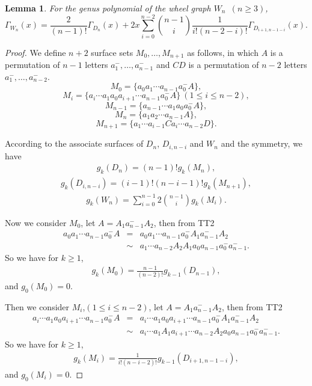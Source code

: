 \documentclass[12pt]{article}
\newtheorem{lemma}[theorem]{Lemma}
\theoremstyle{definition}
\begin{document}
\begin{lemma}\label{le2:1}
For the genus polynomial of the wheel graph $W_n$~$(n\geq 3)$, $$\Gamma_{W_n}(x)= \frac{2}{(n-1)!}\Gamma_{D_{n}}(x)+2x\sum\limits_{i=0}^{n-2}\binom{n-1}{i}\frac{1}{i!(n-2-i)!}\Gamma_{D_{i+1,n-1-i}}(x).$$
\end{lemma}

\begin{proof}
We define $n+2$ surface sets $M_0,\ldots, M_{n+1}$ as follows, in which $A$ is a permutation of $n-1$ letters $a_1^-,\ldots, a_{n-1}^-$ and
$CD$ is a permutation of $n-2$ letters $a_1^-,\ldots, a_{n-2}^-$.
$$M_{0}=\{a_{0}a_{1}\cdots
a_{n-1}a^{-}_{0}A\},$$ $$M_{i}=\{a_{i} \cdots
a_{1}a_{0}a_{i+1} \cdots
a_{n-1}a^{-}_{0}A\}~(1\leq i\leq n-2),$$ $$M_{n-1}=\{a_{n-1}\cdots a_{1}a_{0}a^{-}_{0}A\},$$
$$M_n=\{a_1a_2\cdots a_{n-1}A\},$$
$$M_{n+1}=\{a_1\cdots a_{i-1}C a_i\cdots a_{n-2}D\}.$$

According to the associate surfaces of $D_n$, $D_{i,n-i}$ and $W_n$ and the symmetry,  we have
\begin{eqnarray}\label{e1}
g_k(D_n)=(n-1)!g_k(M_n),\end{eqnarray}
\begin{eqnarray}\label{e2}
g_k(D_{i,n-i})=(i-1)!(n-i-1)!g_k(M_{n+1}),\end{eqnarray}
\begin{eqnarray}\label{e3} g_k(W_n)=\sum\limits_{i=0}^{n-1}2\binom{n-1}{i}g_k(M_i).\end{eqnarray}


Now we consider $M_0$, let $A=A_1a_{n-1}^-A_2$, then from TT2
\begin{eqnarray*}
a_{0}a_{1}\cdots a_{n-1}a^{-}_{0}A&=&a_{0}a_{1}\cdots a_{n-1}a^{-}_{0}A_1a_{n-1}^-A_2\\
&\sim & a_1\cdots a_{n-2}A_2A_1a_0a_{n-1}a_0^-a_{n-1}^-.
\end{eqnarray*}
So we have for $k\geq 1$,
\begin{eqnarray}\label{e4} g_k(M_0)=\frac{n-1}{(n-2)!}g_{k-1}(D_{n-1}),\end{eqnarray}
and $g_0(M_0)=0.$


Then we consider $M_i$,$(1\leq i\leq n-2)$, let $A=A_1a_{n-1}^-A_2$, then from TT2
\begin{eqnarray*}
a_{i} \cdots a_{1}a_{0}a_{i+1} \cdots a_{n-1}a^{-}_{0}A&=&a_{i} \cdots a_{1}a_{0}a_{i+1} \cdots a_{n-1}a^{-}_{0}A_1a_{n-1}^-A_2\\
&\sim & a_i\cdots a_1A_1a_{i+1}\cdots a_{n-2}A_2a_0a_{n-1}a_0^-a_{n-1}^-.
\end{eqnarray*}
So we have for $k\geq 1$,
\begin{eqnarray}\label{e5}
g_k(M_i)=\frac{1}{i!(n-i-2)!}g_{k-1}(D_{i+1,n-1-i}),\end{eqnarray}
and $g_0(M_i)=0.$


\end{proof}
\end{document}
